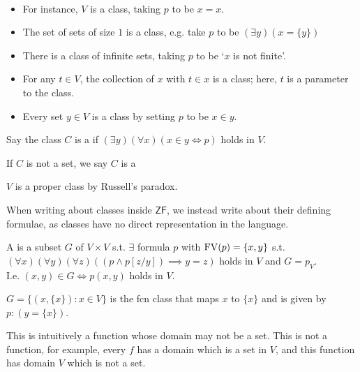 \begin{enumerate}
    \begin{example} ~\vspace*{-1.5\baselineskip}
        \begin{itemize}
            \item For instance, $V$ is a class, taking $p$ to be $x = x$.
            \item The set of sets of size $1$ is a class, e.g. take $p$ to be $(\exists y)(x = \{y\})$
            \item There is a class of infinite sets, taking $p$ to be `$x$ is not finite'.
            \item For any $t \in V$, the collection of $x$ with $t \in x$ is a class; here, $t$ is a parameter to the class.
            \item Every set $y \in V$ is a class by setting $p$ to be $x \in y$.
        \end{itemize}
    \end{example}

    Say the class $C$ is a  if $(\exists y)(\forall x)(x \in y \iff p)$ holds in $V$.

    \begin{definition}
        If $C$ is not a set, we say $C$ is a 
    \end{definition}

    \begin{example}
        $V$ is a proper class by Russell's paradox.
    \end{example}

    When writing about classes inside $\mathsf{ZF}$, we instead write about their defining formulae, as classes have no direct representation in the language.

    \begin{definition}
        A  is a subset $G$ of $V \times V$ s.t. $\exists$ formula $p$ with $\operatorname{FV}(p) = \{x, y\}$ s.t. $(\forall x)(\forall y)(\forall z)((p \wedge p[z/y]) \implies y = z)$ holds in $V$ and $G = p_V$. \\
        I.e. $(x, y) \in G \iff p(x, y)$ holds in $V$.
    \end{definition}

    \begin{example}
        $G = \{(x, \{x\}) : x \in V\}$ is the fcn class that maps $x$ to $\{x\}$ and is given by $p : (y = \{x\})$.
    \end{example}

    This is intuitively a function whose domain may not be a set.
    This is not a function, for example, every $f$ has a domain which is a set in $V$, and this function has domain $V$ which is not a set.


\end{enumerate}
